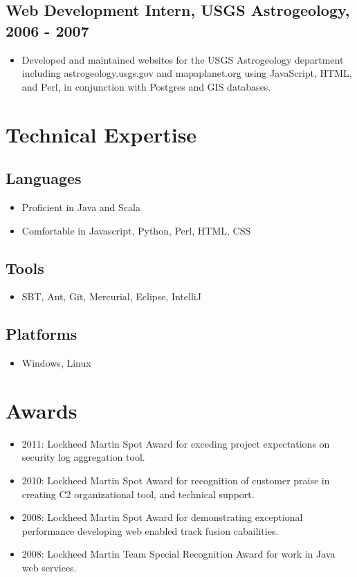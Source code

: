 \documentclass[11pt]{article}
\begin{document}
\subsection*{Web Development Intern, USGS Astrogeology, 2006 - 2007}
\label{sec-1.2}

\begin{itemize}
\item Developed and maintained websites for the USGS Astrogeology department including astrogeology.usgs.gov and mapaplanet.org using JavaScript, HTML, and Perl, in conjunction with Postgres and GIS databases.
\end{itemize}
\section*{Technical Expertise}
\label{sec-2}

\subsection*{Languages}
\label{sec-2.1}

\begin{itemize}
\item Proficient in Java and Scala
\item Comfortable in Javascript, Python, Perl, HTML, CSS
\end{itemize}
\subsection*{Tools}
\label{sec-2.2}

\begin{itemize}
\item SBT, Ant, Git, Mercurial, Eclipse, IntelliJ
\end{itemize}
\subsection*{Platforms}
\label{sec-2.3}

\begin{itemize}
\item Windows, Linux
\end{itemize}
\section*{Awards}
\label{sec-3}

\begin{itemize}
\item 2011: Lockheed Martin Spot Award for exceding project expectations on security log aggregation tool.
\item 2010: Lockheed Martin Spot Award for recognition of customer praise in creating C2 organizational tool, and technical support.
\item 2008: Lockheed Martin Spot Award for demonstrating exceptional performance developing web enabled track fusion cabailities.
\item 2008: Lockheed Martin Team Special Recognition Award for work in Java web services.
\end{itemize}
\end{document}
